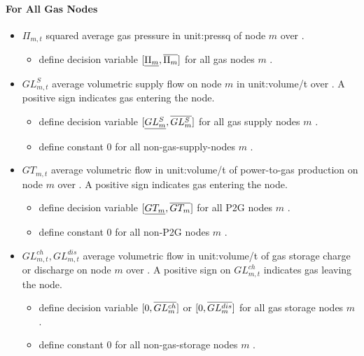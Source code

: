 \paragraph{For All Gas Nodes}
\begin{itemize}

\item $\Pi_{m,t}$ squared average gas pressure in \gls{unit:pressq} of node $m$
  over \intervaloft{}.  \begin{itemize} \item \gls{define} decision variable
    $[\underline{\Pi_m}, \overline{\Pi_m}]$ for all gas nodes $m$ \atallt{}.  \end{itemize}

\item $GL^S_{m,t}$ average volumetric supply flow on node $m$ in
  \gls{unit:volume/t} over \intervaloft{}. A positive sign indicates gas
  entering the node.  \begin{itemize} \item \gls{define} decision variable
  $[\underline{GL^S_m}, \overline{GL^S_m}]$ for all gas supply nodes
  $m$ \atallt{}.  \item \gls{define} constant $0$ for all non-gas-supply-nodes
  $m$ \atallt{}.  \end{itemize}

\item $GT_{m,t}$ average volumetric flow in \gls{unit:volume/t}
of power-to-gas production on node $m$ over \intervaloft{}. A positive sign
  indicates gas entering the node.  \begin{itemize} \item \gls{define} decision
  variable $[\underline{GT_m}, \overline{GT_m}]$ for all P2G nodes
  $m$ \atallt{}. \item \gls{define} constant $0$ for all non-P2G nodes
  $m$ \atallt{}.  \end{itemize}


\item $GL^{ch}_{m,t}, GL^{dis}_{m,t}$ average volumetric flow in \gls{unit:volume/t}
of gas storage charge or discharge on node $m$ over \intervaloft{}. A positive
  sign on $GL^{ch}_{m,t}$ indicates gas leaving the
  node.  \begin{itemize} \item \gls{define} decision variable
  $[0, \overline{GL^{ch}_m}]$ or $[0, \overline{GL^{dis}_m}]$ for all gas storage nodes
  $m$ \atallt{}.  \item \gls{define} constant $0$ for all non-gas-storage nodes
  $m$ \atallt{}. \end{itemize}


\end{itemize}
